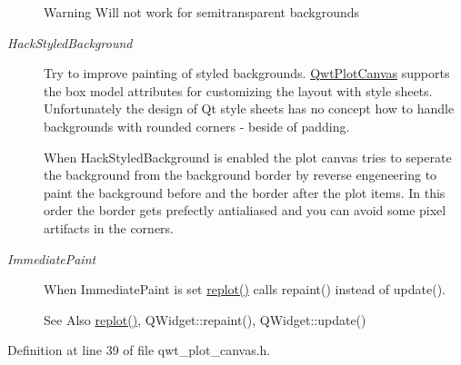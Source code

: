 \begin{Desc}
\begin{description}
\begin{DoxyWarning}{Warning}
Will not work for semitransparent backgrounds 
\end{DoxyWarning}
\item[{\em 
\hypertarget{class_qwt_plot_canvas_a76066290edb594a71ee09be564563b0fa2a2fee2c1807f8306850e15977bacb70}{Hack\-Styled\-Background}\label{class_qwt_plot_canvas_a76066290edb594a71ee09be564563b0fa2a2fee2c1807f8306850e15977bacb70}
}]Try to improve painting of styled backgrounds. \hyperlink{class_qwt_plot_canvas}{Qwt\-Plot\-Canvas} supports the box model attributes for customizing the layout with style sheets. Unfortunately the design of Qt style sheets has no concept how to handle backgrounds with rounded corners -\/ beside of padding.

When Hack\-Styled\-Background is enabled the plot canvas tries to seperate the background from the background border by reverse engeneering to paint the background before and the border after the plot items. In this order the border gets prefectly antialiased and you can avoid some pixel artifacts in the corners. \item[{\em 
\hypertarget{class_qwt_plot_canvas_a76066290edb594a71ee09be564563b0fa91fb95b7ec380cc5d517195c2ae6368f}{Immediate\-Paint}\label{class_qwt_plot_canvas_a76066290edb594a71ee09be564563b0fa91fb95b7ec380cc5d517195c2ae6368f}
}]When Immediate\-Paint is set \hyperlink{class_qwt_plot_canvas_a1548423348c29001ee2b6fd1c0f9f033}{replot()} calls repaint() instead of update().

\begin{DoxySeeAlso}{See Also}
\hyperlink{class_qwt_plot_canvas_a1548423348c29001ee2b6fd1c0f9f033}{replot()}, Q\-Widget\-::repaint(), Q\-Widget\-::update() 
\end{DoxySeeAlso}
\end{description}
\end{Desc}


Definition at line 39 of file qwt\-\_\-plot\-\_\-canvas.\-h.



